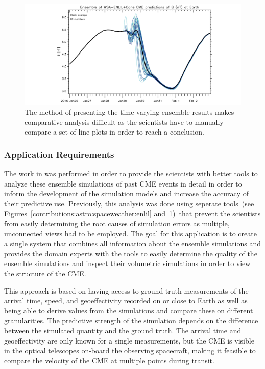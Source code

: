 \begin{figure}
\includegraphics[width=\textwidth]{figures/contributions/spaceweather/ensemble.png}
\caption{The method of presenting the time-varying ensemble results makes comparative analysis difficult as the scientists have to manually compare a set of line plots in order to reach a conclusion.}
\label{contributions:astro:spaceweather:ensemble}
\end{figure}


\subsubsection{Application Requirements} \label{contributions:astro:spaceweather:requirements}
The work in  was performed in order to provide the scientists with better tools to analyze these ensemble simulations of past CME events in detail in order to inform the development of the simulation models and increase the accuracy of their predictive use.  Previously, this analysis was done using seperate tools~(see Figures~\ref{contributions:astro:spaceweather:enlil} and~\ref{contributions:astro:spaceweather:ensemble})~that prevent the scientists from easily determining the root causes of simulation errors as multiple, unconnected views had to be employed.  The goal for this application is to create a single system that combines all information about the ensemble simulations and provides the domain experts with the tools to easily determine the quality of the ensemble simulations and inspect their volumetric simulations in order to view the  structure of the CME.

This approach is based on having access to ground-truth measurements of the arrival time, speed, and geoeffectivity recorded on or close to Earth as well as being able to derive values from the simulations and compare these on different granularities.  The predictive strength of the simulation depends on the difference between the simulated quantity and the ground truth.  The arrival time and geoeffectivity are only known for a single measurements, but the CME is visible in the optical telescopes on-board the observing spacecraft, making it feasible to compare the velocity of the CME at multiple points during transit.

